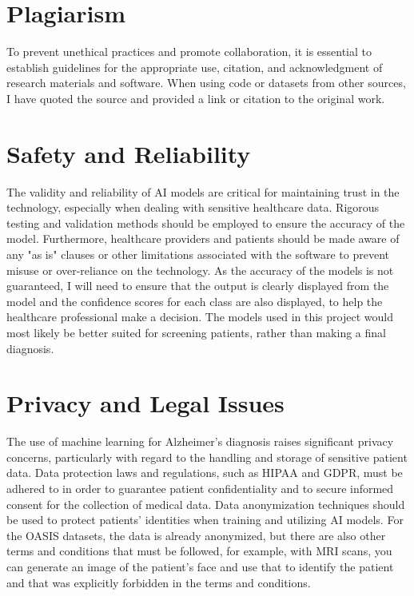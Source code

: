 \documentclass[]{final_report}
\begin{document}
\section{Plagiarism}

To prevent unethical practices and promote collaboration, it is essential to establish guidelines for the appropriate use, citation, and acknowledgment of research materials and software. When using code or datasets from other sources, I have quoted the source and provided a link or citation to the original work.

\section{Safety and Reliability}

The validity and reliability of AI models are critical for maintaining trust in the technology, especially when dealing with sensitive healthcare data. Rigorous testing and validation methods should be employed to ensure the accuracy of the model. Furthermore, healthcare providers and patients should be made aware of any "as is" clauses or other limitations associated with the software to prevent misuse or over-reliance on the technology. As the accuracy of the models is not guaranteed, I will need to ensure that the output is clearly displayed from the model and the confidence scores for each class are also displayed, to help the healthcare professional make a decision. The models used in this project would most likely be better suited for screening patients, rather than making a final diagnosis.

\section{Privacy and Legal Issues}

The use of machine learning for Alzheimer's diagnosis raises significant privacy concerns, particularly with regard to the handling and storage of sensitive patient data. Data protection laws and regulations, such as HIPAA and GDPR, must be adhered to in order to guarantee patient confidentiality and to secure informed consent for the collection of medical data. Data anonymization techniques should be used to protect patients' identities when training and utilizing AI models. For the OASIS datasets, the data is already anonymized, but there are also other terms and conditions that must be followed, for example, with MRI scans, you can generate an image of the patient's face and use that to identify the patient and that was explicitly forbidden in the terms and conditions.
\end{document}
